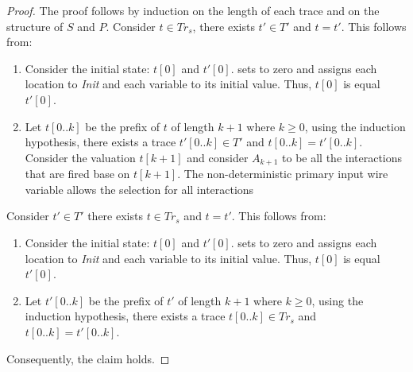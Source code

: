 \begin{proof}
The proof follows by induction on the length of each trace and on the structure of $S$ and $P$.
%
Consider $t \in Tr_s$, there exists $t' \in T'$ and $t = t'$. This follows from: 
\begin{enumerate}
\item Consider the initial state: $t[0]$ and $t'[0]$.  sets  to zero and assigns each location to \textit{Init} and each variable to its initial value. Thus, $t[0]$ is equal $t'[0]$. 
\item Let $t[0..k]$ be the prefix of $t$ of length $k+1$ where $k\ge 0$, using the induction hypothesis, there exists a trace $t'[0..k] \in T'$ and $t[0..k]=t'[0..k]$. 
  Consider the valuation $t[k+1]$ and consider $A_{k+1}$ to be all the interactions that are fired base on $t[k+1]$. 
  The non-deterministic primary input  wire variable allows the selection for all interactions 
\end{enumerate}
Consider $t' \in T'$ there exists $t \in Tr_s$ and $t = t'$. This follows from: 
\begin{enumerate}
\item Consider the initial state: $t[0]$ and $t'[0]$.  sets  to zero and assigns each location to \textit{Init} and each variable to its initial value. Thus, $t[0]$ is equal $t'[0]$. 
\item Let $t'[0..k]$ be the prefix of $t'$ of length $k+1$ where $k\ge 0$, using the induction hypothesis, there exists a trace $t[0..k] \in Tr_s$ and $t[0..k]=t'[0..k]$. 
\end{enumerate}
Consequently, the claim holds. 
\end{proof}







